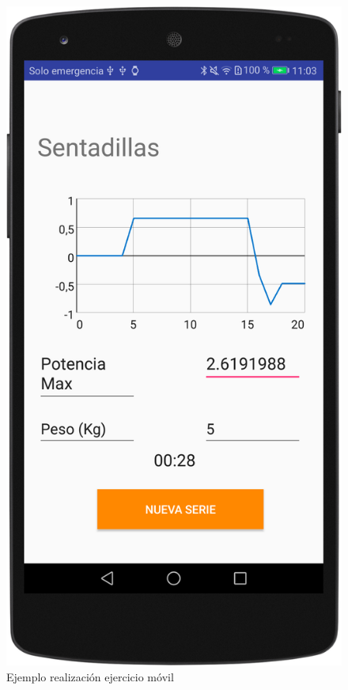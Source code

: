 \begin{figure}[H]
	\centering
	\includegraphics[scale=0.10]{imagenes/m7.png}
	\caption{Ejemplo realización ejercicio móvil}
	\label{Realización ejercicio 7}
\end{figure}


